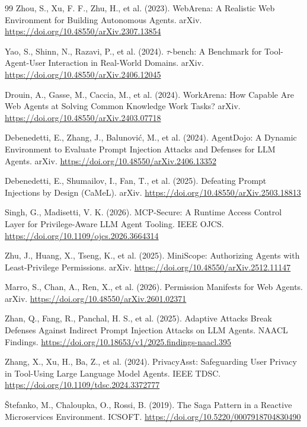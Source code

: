 \documentclass[11pt]{article}
\begin{document}
\begin{thebibliography}{99}
 Zhou, S., Xu, F. F., Zhu, H., et al. (2023). WebArena: A
Realistic Web Environment for Building Autonomous Agents. arXiv.
\url{https://doi.org/10.48550/arXiv.2307.13854}

 Yao, S., Shinn, N., Razavi, P., et al. (2024). $\tau$-bench:
A Benchmark for Tool-Agent-User Interaction in Real-World Domains. arXiv.
\url{https://doi.org/10.48550/arXiv.2406.12045}

 Drouin, A., Gasse, M., Caccia, M., et al. (2024). WorkArena:
How Capable Are Web Agents at Solving Common Knowledge Work Tasks? arXiv.
\url{https://doi.org/10.48550/arXiv.2403.07718}

 Debenedetti, E., Zhang, J., Balunović, M., et al. (2024).
AgentDojo: A Dynamic Environment to Evaluate Prompt Injection Attacks and
Defenses for LLM Agents. arXiv. \url{https://doi.org/10.48550/arXiv.2406.13352}

 Debenedetti, E., Shumailov, I., Fan, T., et al. (2025).
Defeating Prompt Injections by Design (CaMeL). arXiv.
\url{https://doi.org/10.48550/arXiv.2503.18813}

 Singh, G., Madisetti, V. K. (2026). MCP-Secure: A Runtime
Access Control Layer for Privilege-Aware LLM Agent Tooling. IEEE OJCS.
\url{https://doi.org/10.1109/ojcs.2026.3664314}

 Zhu, J., Huang, X., Tseng, K., et al. (2025). MiniScope:
Authorizing Agents with Least-Privilege Permissions. arXiv.
\url{https://doi.org/10.48550/arXiv.2512.11147}

 Marro, S., Chan, A., Ren, X., et al. (2026). Permission
Manifests for Web Agents. arXiv. \url{https://doi.org/10.48550/arXiv.2601.02371}

 Zhan, Q., Fang, R., Panchal, H. S., et al. (2025).
Adaptive Attacks Break Defenses Against Indirect Prompt Injection Attacks on
LLM Agents. NAACL Findings. \url{https://doi.org/10.18653/v1/2025.findings-naacl.395}

 Zhang, X., Xu, H., Ba, Z., et al. (2024). PrivacyAsst:
Safeguarding User Privacy in Tool-Using Large Language Model Agents. IEEE TDSC.
\url{https://doi.org/10.1109/tdsc.2024.3372777}

 Štefanko, M., Chaloupka, O., Rossi, B. (2019). The Saga Pattern
in a Reactive Microservices Environment. ICSOFT.
\url{https://doi.org/10.5220/0007918704830490}


\end{thebibliography}
\end{document}
